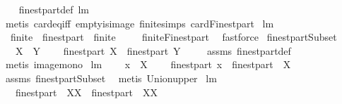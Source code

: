 \begin{isabellebody}
%
\isadelimproof
\ \ %
\endisadelimproof
%
\isatagproof
{}\isamarkupfalse%
\ finestpart{\isacharunderscore}def\ lm{}{}{}\ \isanewline
\ \ \isamarkupfalse%
\ {\isacharparenleft}metis\ card{\isacharunderscore}eq{\isacharunderscore}{}{\isacharunderscore}iff\ empty{\isacharunderscore}is{\isacharunderscore}image\ finite{\isachardot}simps\ cardFinestpart{\isacharparenright}%
\endisatagproof
{\isafoldproof}%
%
\isadelimproof
\isanewline
%
\endisadelimproof
\isanewline
{}\isamarkupfalse%
\ lm{}{}{}{\isacharcolon}\ \isanewline
\ \ {\isachardoublequoteopen}finite\ {\isasymcirc}\ finestpart\ {\isacharequal}\ finite{\isachardoublequoteclose}\ \isanewline
%
\isadelimproof
\ \ %
\endisadelimproof
%
\isatagproof
{}\isamarkupfalse%
\ finiteFinestpart\ \isamarkupfalse%
\ fastforce%
\endisatagproof
{\isafoldproof}%
%
\isadelimproof
\isanewline
%
\endisadelimproof
\isanewline
{}\isamarkupfalse%
\ finestpartSubset{\isacharcolon}\ \isanewline
\ \ \ {\isachardoublequoteopen}X\ {\isasymsubseteq}\ Y{\isachardoublequoteclose}\ \isanewline
\ \ \ {\isachardoublequoteopen}finestpart\ X\ {\isasymsubseteq}\ finestpart\ Y{\isachardoublequoteclose}\ \isanewline
%
\isadelimproof
\ \ %
\endisadelimproof
%
\isatagproof
{}\isamarkupfalse%
\ assms\ finestpart{\isacharunderscore}def\ \isamarkupfalse%
\ {\isacharparenleft}metis\ image{\isacharunderscore}mono{\isacharparenright}%
\endisatagproof
{\isafoldproof}%
%
\isadelimproof
\isanewline
%
\endisadelimproof
\isanewline
{}\isamarkupfalse%
\ lm{}{}{}{\isacharcolon}\ \isanewline
\ \ \ {\isachardoublequoteopen}x\ {\isasymin}\ X{\isachardoublequoteclose}\ \isanewline
\ \ \ {\isachardoublequoteopen}finestpart\ x\ {\isasymsubseteq}\ finestpart\ {\isacharparenleft}{\isasymUnion}\ X{\isacharparenright}{\isachardoublequoteclose}\ \isanewline
%
\isadelimproof
\ \ %
\endisadelimproof
%
\isatagproof
{}\isamarkupfalse%
\ assms\ finestpartSubset\ \isamarkupfalse%
\ {\isacharparenleft}metis\ Union{\isacharunderscore}upper{\isacharparenright}%
\endisatagproof
{\isafoldproof}%
%
\isadelimproof
\isanewline
%
\endisadelimproof
\isanewline
{}\isamarkupfalse%
\ lm{}{}{}{\isacharcolon}\ \isanewline
\ \ {\isachardoublequoteopen}{\isasymUnion}\ {\isacharparenleft}finestpart\ {\isacharbackquote}\ XX{\isacharparenright}\ {\isasymsubseteq}\ finestpart\ {\isacharparenleft}{\isasymUnion}\ XX{\isacharparenright}{\isachardoublequoteclose}\ \isanewline

\end{isabellebody}
